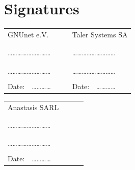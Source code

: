 \documentclass[12pt, a4paper, bibliography=totocnumbered]{article}
\begin{document}
\section*{Signatures}
\begin{tabularx}{\textwidth}{ XXXX }
GNUnet e.V. & & & Taler Systems SA \\
& & &\\
& & &\\
\dots{}\dots{}\dots{}\dots{}\dots{}\dots{}\dots{}\dots{}\dots{}&&&
\dots{}\dots{}\dots{}\dots{}\dots{}\dots{}\dots{}\dots{}\dots{}\\
& & &\\
& & &\\
\dots{}\dots{}\dots{}\dots{}\dots{}\dots{}\dots{}\dots{}\dots{}&&&
\dots{}\dots{}\dots{}\dots{}\dots{}\dots{}\dots{}\dots{}\dots{}\\
& & &\\
Date:~~\dots{}\dots{}\dots{}\dots{} & & &Date:~~\dots{}\dots{}\dots{}\dots{}\\
\end{tabularx}
\begin{tabularx}{\textwidth}{ XXXX }
Anastasis SARL & & & \\
& & &\\
& & &\\
\dots{}\dots{}\dots{}\dots{}\dots{}\dots{}\dots{}\dots{}\dots{}&&&
\\
& & &\\
& & &\\
\dots{}\dots{}\dots{}\dots{}\dots{}\dots{}\dots{}\dots{}\dots{}&&&
\\
& & &\\
Date:~~\dots{}\dots{}\dots{}\dots{} & & &
\end{tabularx}
%
%
\end{document}
